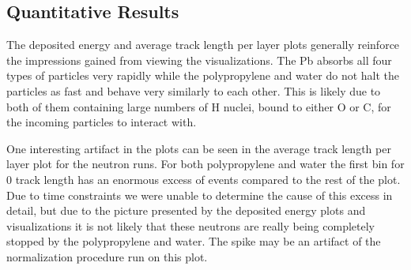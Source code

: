 \documentclass[aps,prd,twocolumn,nofootinbib]{revtex4-1}
\begin{document}
\subsection{Quantitative Results}

The deposited energy and average track length per layer plots generally reinforce the impressions gained from viewing the visualizations. The Pb absorbs all four types of particles very rapidly while the polypropylene and water do not halt the particles as fast and behave very similarly to each other. This is likely due to both of them containing large numbers of H nuclei, bound to either O or C, for the incoming particles to interact with.

One interesting artifact in the plots can be seen in the average track length per layer plot for the neutron runs. For both polypropylene and water the first bin for 0 track length has an enormous excess of events compared to the rest of the plot. Due to time constraints we were unable to determine the cause of this excess in detail, but due to the picture presented by the deposited energy plots and visualizations it is not likely that these neutrons are really being completely stopped by the polypropylene and water. The spike may be an artifact of the normalization procedure run on this plot. 
\end{document}
